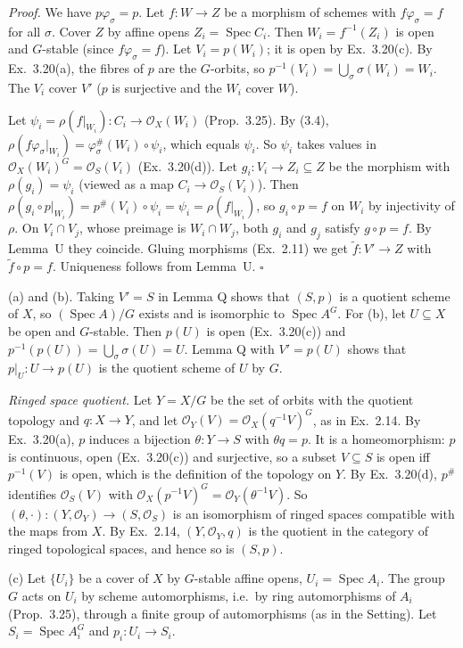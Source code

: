 \documentclass[11pt]{article}
\begin{document}
\emph{Proof.} We have $p\varphi_\sigma=p$. Let $f:W\to Z$ be a morphism of schemes with $f\varphi_\sigma=f$ for all $\sigma$. Cover $Z$ by affine opens $Z_i=\operatorname{Spec}C_i$. Then $W_i=f^{-1}(Z_i)$ is open and $G$-stable (since $f\varphi_\sigma=f$). Let $V_i=p(W_i)$; it is open by Ex.~3.20(c). By Ex.~3.20(a), the fibres of $p$ are the $G$-orbits, so $p^{-1}(V_i)=\bigcup_\sigma\sigma(W_i)=W_i$. The $V_i$ cover $V'$ ($p$ is surjective and the $W_i$ cover $W$).

Let $\psi_i=\rho(f|_{W_i}):C_i\to\mathcal{O}_X(W_i)$ (Prop.~3.25). By (3.4), $\rho(f\varphi_\sigma|_{W_i})=\varphi_\sigma^\#(W_i)\circ\psi_i$, which equals $\psi_i$. So $\psi_i$ takes values in $\mathcal{O}_X(W_i)^G=\mathcal{O}_S(V_i)$ (Ex.~3.20(d)). Let $g_i:V_i\to Z_i\subseteq Z$ be the morphism with $\rho(g_i)=\psi_i$ (viewed as a map $C_i\to\mathcal{O}_S(V_i)$). Then $\rho(g_i\circ p|_{W_i})=p^\#(V_i)\circ\psi_i=\psi_i=\rho(f|_{W_i})$, so $g_i\circ p=f$ on $W_i$ by injectivity of $\rho$. On $V_i\cap V_j$, whose preimage is $W_i\cap W_j$, both $g_i$ and $g_j$ satisfy $g\circ p=f$. By Lemma~U they coincide. Gluing morphisms (Ex.~2.11) we get $\tilde f:V'\to Z$ with $\tilde f\circ p=f$. Uniqueness follows from Lemma~U. $\square$

(a) and (b). Taking $V'=S$ in Lemma Q shows that $(S,p)$ is a quotient scheme of $X$, so $(\operatorname{Spec}A)/G$ exists and is isomorphic to $\operatorname{Spec}A^G$. For (b), let $U\subseteq X$ be open and $G$-stable. Then $p(U)$ is open (Ex.~3.20(c)) and $p^{-1}(p(U))=\bigcup_\sigma\sigma(U)=U$. Lemma Q with $V'=p(U)$ shows that $p|_U:U\to p(U)$ is the quotient scheme of $U$ by $G$.

\emph{Ringed space quotient.} Let $Y=X/G$ be the set of orbits with the quotient topology and $q:X\to Y$, and let $\mathcal{O}_Y(V)=\mathcal{O}_X(q^{-1}V)^G$, as in Ex.~2.14. By Ex.~3.20(a), $p$ induces a bijection $\theta:Y\to S$ with $\theta q=p$. It is a homeomorphism: $p$ is continuous, open (Ex.~3.20(c)) and surjective, so a subset $V\subseteq S$ is open iff $p^{-1}(V)$ is open, which is the definition of the topology on $Y$. By Ex.~3.20(d), $p^\#$ identifies $\mathcal{O}_S(V)$ with $\mathcal{O}_X(p^{-1}V)^G=\mathcal{O}_Y(\theta^{-1}V)$. So $(\theta,\cdot):(Y,\mathcal{O}_Y)\to(S,\mathcal{O}_S)$ is an isomorphism of ringed spaces compatible with the maps from $X$. By Ex.~2.14, $(Y,\mathcal{O}_Y,q)$ is the quotient in the category of ringed topological spaces, and hence so is $(S,p)$.

(c) Let $\{U_i\}$ be a cover of $X$ by $G$-stable affine opens, $U_i=\operatorname{Spec}A_i$. The group $G$ acts on $U_i$ by scheme automorphisms, i.e.\ by ring automorphisms of $A_i$ (Prop.~3.25), through a finite group of automorphisms (as in the Setting). Let $S_i=\operatorname{Spec}A_i^G$ and $p_i:U_i\to S_i$.
\end{document}
